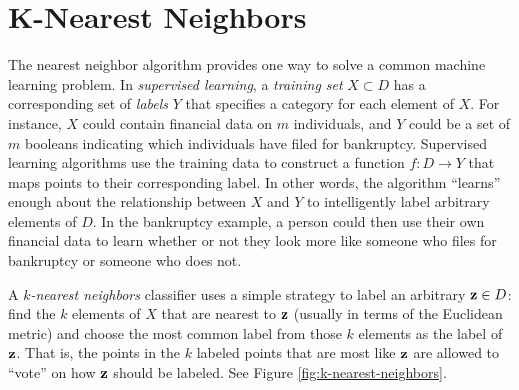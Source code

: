 \section*{K-Nearest Neighbors} %

The nearest neighbor algorithm provides one way to solve a common machine learning problem.
In \emph{supervised learning},
a \emph{training set} $X\subset D$ has a corresponding set of \emph{labels} $Y$ that specifies a category for each element of $X$.
For instance, $X$ could contain financial data on $m$ individuals, and $Y$ could be a set of $m$ booleans indicating which individuals have filed for bankruptcy.
Supervised learning algorithms use the training data to construct a function $f:D\rightarrow Y$ that maps points to their corresponding label.
In other words, the algorithm ``learns'' enough about the relationship between $X$ and $Y$ to intelligently label arbitrary elements of $D$.
In the bankruptcy example, a person could then use their own financial data to learn whether or not they look more like someone who files for bankruptcy or someone who does not.

A \emph{$k$-nearest neighbors} classifier uses a simple strategy to label an arbitrary $\mathbf{z}\in D$: find the $k$ elements of $X$ that are nearest to $\mathbf{z}$ (usually in terms of the Euclidean metric) and choose the most common label from those $k$ elements as the label of $\mathbf{z}$.
That is, the points in the $k$ labeled points that are most like $\mathbf{z}$ are allowed to ``vote'' on how $\mathbf{z}$ should be labeled.
See Figure \ref{fig:k-nearest-neighbors}.

